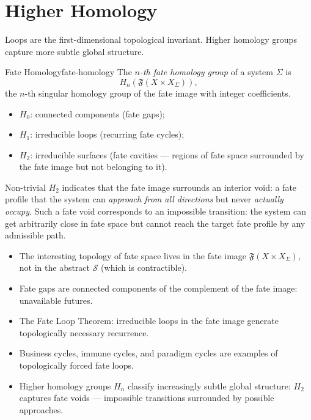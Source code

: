 \documentclass[12pt,twoside,openright]{book}
\newcommand{\distPairs}{X\times X}
\newcommand{\fateMap}{\mathfrak{F}}
\newcommand{\fateSpace}{\mathcal{S}}
\newenvironment{chapsummary}{%
  \begin{tcolorbox}[colback=DistBlue!5,colframe=DistBlue,
    title={\faBookOpen\enspace Summary},
    fonttitle=\sffamily\bfseries\color{white},
    attach boxed title to top left={yshift=-2mm,xshift=4mm},
    boxed title style={colback=DistBlue,rounded corners}]
  \begin{itemize}[nosep,leftmargin=*]}{%
  \end{itemize}\end{tcolorbox}}
\providecommand{\fateImage}[1]{\fateMap(#1)}
\providecommand{\fateHom}[2]{H_{#1}(\fateImage{#2})}
\begin{document}
\section{Higher Homology}

Loops are the first-dimensional topological invariant. Higher
homology groups capture more subtle global structure.

\begin{definition}{Fate Homology}{fate-homology}
The \emph{$n$-th fate homology group} of a system $\Sigma$ is
\[
  \fateHom{n}{\distPairs_\Sigma},
\]
the $n$-th singular homology group of the fate image with
integer coefficients.

\begin{itemize}[nosep,leftmargin=2em]
  \item $H_0$: connected components (fate gaps);
  \item $H_1$: irreducible loops (recurring fate cycles);
  \item $H_2$: irreducible surfaces (fate cavities --- regions
    of fate space surrounded by the fate image but not
    belonging to it).
\end{itemize}
\end{definition}

Non-trivial $H_2$ indicates that the fate image surrounds an
interior void: a fate profile that the system can \emph{approach
from all directions} but never \emph{actually occupy}. Such a
fate void corresponds to an impossible transition: the system
can get arbitrarily close in fate space but cannot reach the
target fate profile by any admissible path.

\begin{chapsummary}
\item The interesting topology of fate space lives in the fate
  image $\fateMap(\distPairs_\Sigma)$, not in the abstract
  $\fateSpace$ (which is contractible).
\item Fate gaps are connected components of the complement of
  the fate image: unavailable futures.
\item The Fate Loop Theorem: irreducible loops in the fate image
  generate topologically necessary recurrence.
\item Business cycles, immune cycles, and paradigm cycles are
  examples of topologically forced fate loops.
\item Higher homology groups $H_n$ classify increasingly subtle
  global structure: $H_2$ captures fate voids --- impossible
  transitions surrounded by possible approaches.
\end{chapsummary}
\end{document}
